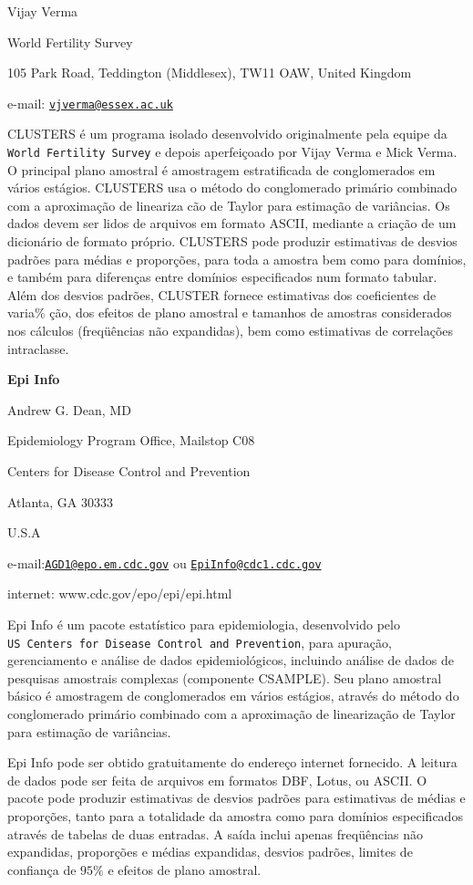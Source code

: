 \documentclass[]{book}
\numberwithin{example}{chapter}
\numberwithin{remark}{chapter}
\numberwithin{definition}{chapter}
\begin{document}
Vijay Verma

World Fertility Survey

105 Park Road, Teddington (Middlesex), TW11 OAW, United Kingdom

e-mail:
\href{mailto:vjverma@essex.ac.uk}{\nolinkurl{vjverma@essex.ac.uk}}

CLUSTERS é um programa isolado desenvolvido originalmente pela equipe da
\texttt{World\ Fertility\ Survey} e depois aperfeiçoado por Vijay Verma
e Mick Verma. O principal plano amostral é amostragem estratificada de
conglomerados em vários estágios. CLUSTERS usa o método do conglomerado
primário combinado com a aproximação de lineariza\c{%
c}ão de Taylor para estimação de variâncias. Os dados devem ser lidos de
arquivos em formato ASCII, mediante a criação de um dicionário de
formato próprio. CLUSTERS pode produzir estimativas de desvios padrões
para médias e proporções, para toda a amostra bem como para domínios, e
também para diferenças entre domínios especificados num formato tabular.
Além dos desvios padrões, CLUSTER fornece estimativas dos coeficientes
de varia\% ção, dos efeitos de plano amostral e tamanhos de amostras
considerados nos cálculos (freqüências não expandidas), bem como
estimativas de correlações intraclasse.

\textbf{Epi Info}

Andrew G. Dean, MD

Epidemiology Program Office, Mailstop C08

Centers for Disease Control and Prevention

Atlanta, GA 30333

U.S.A

e-mail:\href{mailto:AGD1@epo.em.cdc.gov}{\nolinkurl{AGD1@epo.em.cdc.gov}}
ou \href{mailto:EpiInfo@cdc1.cdc.gov}{\nolinkurl{EpiInfo@cdc1.cdc.gov}}

internet: www.cdc.gov/epo/epi/epi.html

Epi Info é um pacote estatístico para epidemiologia, desenvolvido pelo
\texttt{US\ Centers\ for\ Disease\ Control\ and\ Prevention}, para
apuração, gerenciamento e análise de dados epidemiológicos, incluindo
análise de dados de pesquisas amostrais complexas (componente CSAMPLE).
Seu plano amostral básico é amostragem de conglomerados em vários
estágios, através do método do conglomerado primário combinado com a
aproximação de linearização de Taylor para estimação de variâncias.

Epi Info pode ser obtido gratuitamente do endereço internet fornecido. A
leitura de dados pode ser feita de arquivos em formatos DBF, Lotus, ou
ASCII. O pacote pode produzir estimativas de desvios padrões para
estimativas de médias e proporções, tanto para a totalidade da amostra
como para domínios especificados através de tabelas de duas entradas. A
saída inclui apenas freqüências não expandidas, proporções e médias
expandidas, desvios padrões, limites de confiança de \(95\%\) e efeitos
de plano amostral.


\end{document}
